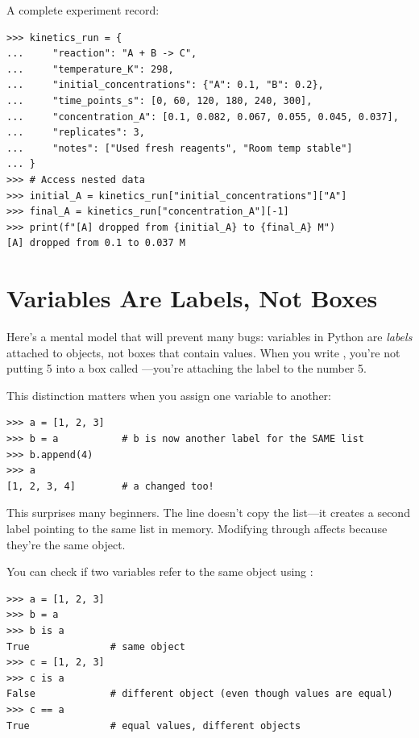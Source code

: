 \begin{labexample}
A complete experiment record:
\begin{lstlisting}
>>> kinetics_run = {
...     "reaction": "A + B -> C",
...     "temperature_K": 298,
...     "initial_concentrations": {"A": 0.1, "B": 0.2},
...     "time_points_s": [0, 60, 120, 180, 240, 300],
...     "concentration_A": [0.1, 0.082, 0.067, 0.055, 0.045, 0.037],
...     "replicates": 3,
...     "notes": ["Used fresh reagents", "Room temp stable"]
... }
>>> # Access nested data
>>> initial_A = kinetics_run["initial_concentrations"]["A"]
>>> final_A = kinetics_run["concentration_A"][-1]
>>> print(f"[A] dropped from {initial_A} to {final_A} M")
[A] dropped from 0.1 to 0.037 M
\end{lstlisting}
\end{labexample}


\section{Variables Are Labels, Not Boxes}
\label{sec:aliasing}

Here's a mental model that will prevent many bugs: variables in Python are \emph{labels} attached to objects, not boxes that contain values. When you write , you're not putting 5 into a box called ---you're attaching the label  to the number 5.

This distinction matters when you assign one variable to another:

\begin{lstlisting}
>>> a = [1, 2, 3]
>>> b = a           # b is now another label for the SAME list
>>> b.append(4)
>>> a
[1, 2, 3, 4]        # a changed too!
\end{lstlisting}

This surprises many beginners. The line  doesn't copy the list---it creates a second label pointing to the same list in memory. Modifying through  affects  because they're the same object.

You can check if two variables refer to the same object using :

\begin{lstlisting}
>>> a = [1, 2, 3]
>>> b = a
>>> b is a
True              # same object
>>> c = [1, 2, 3]
>>> c is a
False             # different object (even though values are equal)
>>> c == a
True              # equal values, different objects
\end{lstlisting}

